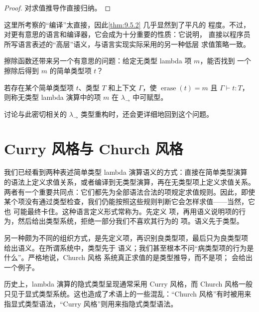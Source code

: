\begin{proof}
对求值推导作直接归纳。
\end{proof}

这里所考察的“编译”太直接，因此\cref{thm:9.5.2} 几乎显然到了平凡的
程度。不过，对更有意思的语言和编译器，它会成为十分重要的性质：它说明，
直接以程序员所写语言表述的“高层”语义，与语言实现实际采用的另一种低层
求值策略一致。

擦除函数还带来另一个有意思的问题：给定无类型 lambda 项 \(m\)，能否找到
一个擦除后得到 \(m\) 的简单类型项 \(t\)？

\begin{definition}
\label{def:9.5.3}
若存在某个简单类型项 \(t\)、类型 \(T\) 和上下文 \(\Gamma\)，使
\(\operatorname{erase}(t)=m\) 且 \(\Gamma\vdash t:T\)，则称无类型
lambda 演算中的项 \(m\) 在 \(\lambda_{\to}\) 中可赋型。
\end{definition}


讨论与此密切相关的
\(\lambda_{\to}\) 类型重构时，还会更详细地回到这个问题。

\section{Curry 风格与 Church 风格}
\label{sec:9.6}

我们已经看到两种表述简单类型 lambda 演算语义的方式：直接在简单类型演算
的语法上定义求值关系，或者编译到无类型演算，再在无类型项上定义求值关系。
两者有一个重要共同点：它们都先为全部语法合法的项规定求值规则。因此，即使
某个项没有通过类型检查，我们仍能按照这些规则判断它会怎样求值——当然，它也
可能最终卡住。这种语言定义形式常称为。先定义
项，再用语义说明项的行为，然后给出类型系统，拒绝一部分我们不喜欢其行为的
项。语义先于类型。

另一种颇为不同的组织方式，是先定义项，再识别良类型项，最后只为良类型项
给出语义。在所谓系统中，类型先于
语义；我们甚至根本不问“病类型项的行为是什么”。严格地说，Church 风格
系统真正求值的是类型推导，而不是项；
 会给出一个例子。

历史上，lambda 演算的隐式类型呈现通常采用 Curry 风格，而 Church 风格一般
只见于显式类型系统。这也造成了术语上的一些混乱：“Church 风格”有时被用来
指显式类型语法，“Curry 风格”则用来指隐式类型语法。


